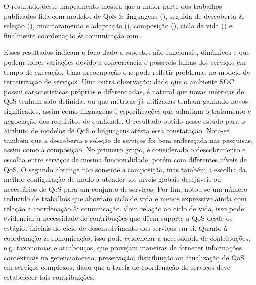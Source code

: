 O resultado desse mapeamento mostra que a maior parte dos trabalhos publicados lida com modelos de QoS \& linguagens (\ModelosdeQoSeLinguagens), seguida de descoberta \& sele\c{c}\~{a}o (\DescobrimentoeSelecao), monitoramento e adapta\c{c}\~{a}o (\MonitoramentoAdaptacao), composi\c{c}\~{a}o (\Composicao), ciclo de vida (\Ciclodevida) e finalmente coordenação \& comunicação com \CoordenacaoeComunicacao.

Esses resultados indicam o foco dado a aspectos não funcionais, dinâmicos e que podem sofrer variações devido a concorrência e poss\'{i}veis falhas dos servi\c{c}os em tempo de execu\c{c}\~{a}o. Uma preocupa\c{c}\~{a}o que pode refletir problemas no modelo de terceirização de serviços. Uma outra observa\c{c}\~{a}o: dado que o ambiente SOC possui características próprias e diferenciadas, é natural que novas métricas de QoS tenham sido definidas ou que métricas já utilizadas tenham ganhado novos significados, assim como linguagens e especificações que admitam o tratamento e negociação dos requisitos de qualidade. O resultado obtido nesse estudo para o atributo de modelos de QoS e linguagens atesta essa constatação. Nota-se também que a descoberta e seleção de serviços foi bem endereçada nas pesquisas, assim como a composição. No primeiro grupo, é considerado o descobrimento e escolha entre serviços de mesma funcionalidade, porém com diferentes níveis de QoS. O segundo abrange não somente a composição, mas também a escolha da melhor configuração de modo a atender aos níveis globais desejáveis ou necessários de QoS para um conjunto de serviços. Por fim, notou-se um número reduzido de trabalhos que abordam ciclo de vida e menos expressivo ainda com rela\c{c}\~{a}o a coordenação \& comunicação. Com rela\c{c}\~{a}o ao ciclo de vida, isso pode evidenciar a necessidade de contribuções que dêem suporte a QoS desde os estágios iniciais do ciclo de desenvolvimento dos serviços em si. Quanto à coordenação \& comunicação, isso pode evidenciar a necessidade de contribuções, e.g. taxonomias e arcabouços, que provejam maneiras de fornecer informações contextuais no gerenciamento, preservação, distribuição ou atualização de QoS em serviços complexos, dado que a tarefa de coordenação de serviços deve estabelecer tais contribuições.